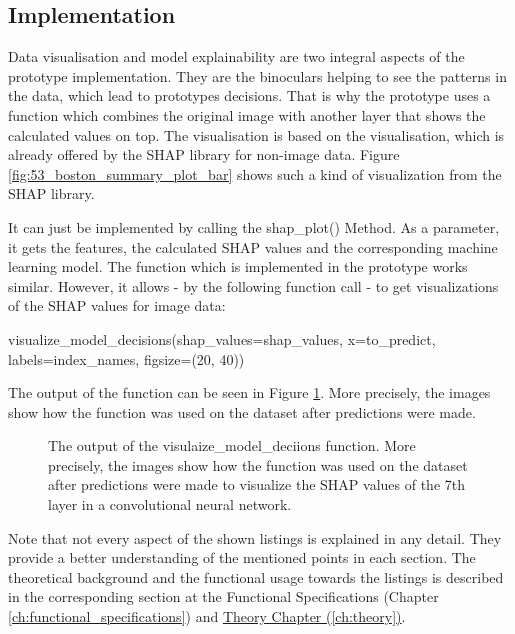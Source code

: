 \subsection{Implementation}

Data visualisation and model explainability are two integral aspects of the prototype implementation. They are the binoculars helping to see the patterns in the data, which lead to prototypes decisions. That is why the prototype uses a function which combines the original image with another layer that shows the calculated values on top. The visualisation is based on the visualisation, which is already offered by the SHAP library for non-image data. Figure \ref{fig:53_boston_summary_plot_bar} shows such a kind of visualization from the SHAP library. 

It can just be implemented by calling the shap\_plot() Method. As a parameter, it gets the features, the calculated SHAP values and the corresponding machine learning model. The function which is implemented in the prototype works similar. However, it allows - by the following function call - to get visualizations of the SHAP values for image data:

\nopagebreak
\begin{python}[label={pred}, caption={Predictions of the pretrained VGG16 Architecture CNN model}]
	visualize_model_decisions(shap_values=shap_values, x=to_predict, 
	labels=index_names, figsize=(20, 40))
\end{python}

The output of the function can be seen in Figure \ref{fig:41_expected_gradients_layer_7}. More precisely, the images show how the function was used on the dataset after predictions were made.

\begin{figure}[htp]
	\centering
	\caption{The output of the visulaize\_model\_deciions function. More precisely, the images show how the function was used on the dataset after predictions were made to visualize the SHAP values of the 7th layer in a convolutional neural network.}
	\label{fig:41_expected_gradients_layer_7}
\end{figure}

Note that not every aspect of the shown listings is explained in any detail. They provide a better understanding of the mentioned points in each section. The theoretical background and the functional usage towards the listings is described in the corresponding section at the Functional Specifications (Chapter \ref{ch:functional_specifications}) and \hyperref[ch:theory]{Theory Chapter (\ref{ch:theory})}. 